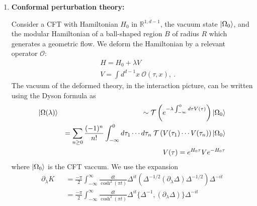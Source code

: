 \documentclass[a4paper,11pt]{article}
\theoremstyle{definition}
\newcommand{\nn}{\nonumber}
\newcommand{\lb}{\left(}
\newcommand{\rb}{\right)}
\newcommand{\p}{\partial}
\newcommand{\ad}{\text{ad}}
\begin{document}
\begin{enumerate}
\begin{eqnarray}
    &&K_{\Phi|\Psi}-K_\Omega=\lambda K^{(10)}+\mu K^{(01)}+\lambda\mu K^{(11)}+O(\lambda^2)+O(\mu^2)\nn\\
    &&K^{(10)}=-\frac{1}{2}\mathcal{F}(\phi^{(1)}_{-i/2}+\phi^{(1)}_{i/2}),\nn\\
    &&K^{(01)}=\mathcal{F}(J\psi^{(1)}J),\qquad K^{(11)}=0\nn\\
    &&\mathcal{F}(X)=\pi\int_{-\infty}^\infty \frac{dt}{\cosh^2(\pi t)}e^{i t \ad_K}(X)=\frac{\pi\ad_K}{\sinh(\ad_K/2)}(X)\ .
\end{eqnarray}
As a result, for the one-parameter family of excited states $\ket{\Phi(\lambda)}$, we set $\phi^{(1)}=\psi^{(1)}$ and
$K'=K^{(10)}+K^{(01)}$. Plugging this into (\ref{Hprimez0}) of Lemma \ref{lemma:perturb} and taking $R\p_R$ derivatives gives the first-order correction to our Hamiltonian away from the fixed point.

\item  {\bf Conformal perturbation theory:}

Consider a CFT with Hamiltonian $H_0$ in $\mathbb{R}^{1,d-1}$, the vacuum state $\ket{\Omega_0}$, and the modular Hamiltonian of a ball-shaped region $B$ of radius $R$ which generates a geometric flow.
We deform the Hamiltonian by a relevant operator $\mathcal{O}$:
\begin{eqnarray}
    &&H=H_0+\lambda V\nn\\
    &&V=\int d^{d-1}x \:\mathcal{O}(\tau,x),\ .
\end{eqnarray}
The vacuum of the deformed theory, in the interaction picture, can be written using the Dyson formula as
\begin{eqnarray}
 \ket{\Omega(\lambda)}&&\sim \mathcal{T}\lb e^{-\lambda\int_{-\infty}^0  d\tau V(\tau)}\rb\ket{\Omega_0}\nn\\
 &&=\sum_{n\geq 0}\frac{(-1)^n}{n!}\int_{-\infty}^0d\tau_1\cdots d\tau_n \:\mathcal{T}\lb V(\tau_1)\cdots V(\tau_n)\rb\ket{\Omega_0} \nn\\
 &&V(\tau)=e^{H_0\tau}V e^{-H_0\tau}
\end{eqnarray}
where $\ket{\Omega_0}$ is the CFT vaccum. We use the expansion \cite{lashkari2023perturbation}
\begin{eqnarray}\label{logexpansion}
    \p_\lambda K&&=\frac{-\pi}{2}\int_{-\infty}^\infty \frac{dt}{\cosh^2(\pi t)}\Delta^{it}\lb \Delta^{-1/2}(\p_\lambda\Delta)\Delta^{-1/2}\rb \Delta^{-it}\nn\\
   && =\frac{-\pi}{2}\int_{-\infty}^\infty \frac{dt}{\cosh^2(\pi t)}\Delta^{it} \{\Delta^{-1},(\p_\lambda\Delta)\}\Delta^{-it}
\end{eqnarray}


\end{enumerate}
\end{document}
